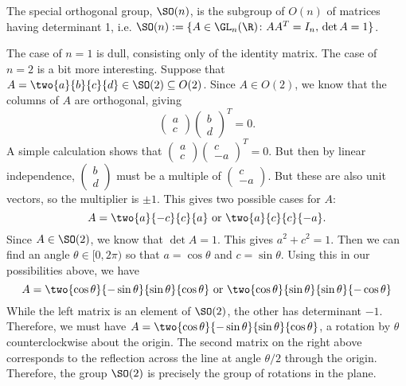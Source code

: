 \begin{dfn}
The special orthogonal group, $\SO(n)$, is the subgroup of $O(n)$ of matrices having determinant 1, i.e. $\SO(n):= \{ A \in \GL_n(\R) \colon AA^T=I_n,\, \det A=1\}$. 
\end{dfn}


\begin{ex} \label{ex:so2}
The case of $n=1$ is dull, consisting only of the identity matrix. The case of $n=2$ is a bit more interesting. Suppose that $A= \two{a}{b}{c}{d} \in \SO(2) \subseteq O(2)$. Since $A \in O(2)$, we know that the columns of $A$ are orthogonal, giving
	\[
	\begin{pmatrix} a \\ c \end{pmatrix} \begin{pmatrix} b \\ d \end{pmatrix}^T=0.
	\]
A simple calculation shows that $\begin{pmatrix} a \\ c \end{pmatrix} \begin{pmatrix} c \\ -a \end{pmatrix}^T=0$. But then by linear independence, $\begin{pmatrix} b \\ d \end{pmatrix}$ must be a multiple of $\begin{pmatrix} c \\ -a \end{pmatrix}$. But these are also unit vectors, so the multiplier is $\pm 1$. This gives two possible cases for $A$: 
	\[
	A=\two{a}{-c}{c}{a} \text{ or } \two{a}{c}{c}{-a}.
	\]
Since $A \in \SO(2)$, we know that $\det A=1$. This gives $a^2+c^2=1$. Then we can find an angle $\theta \in [0,2\pi)$ so that $a= \cos \theta$ and $c= \sin \theta$. Using this in our possibilities above, we have
	\[
	A=\two{\cos\theta}{-\sin\theta}{\sin\theta}{\cos\theta} \text{ or } \two{\cos\theta}{\sin\theta}{\sin\theta}{-\cos\theta}
	\]
While the left matrix is an element of $\SO(2)$, the other has determinant $-1$. Therefore, we must have $A= \two{\cos\theta}{-\sin\theta}{\sin\theta}{\cos\theta}$, a rotation by $\theta$ counterclockwise about the origin. The second matrix on the right above corresponds to the reflection across the line at angle $\theta/2$ through the origin. Therefore, the group $\SO(2)$ is precisely the group of rotations in the plane. 
\xqed
\end{ex}


